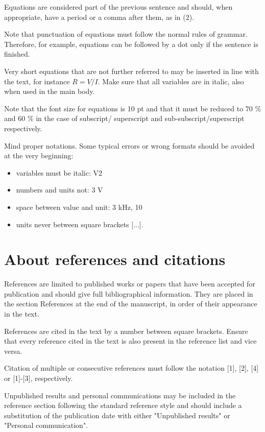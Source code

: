 \documentclass[10pt]{../imeko_acta}
\begin{document}
Equations are considered part of the previous sentence and should, when appropriate, have a period or a comma after them, as in (2).

Note that punctuation of equations must follow the normal rules of grammar. Therefore, for example, equations can be followed by a dot only if the sentence is finished.

Very short equations that are not further referred to may be inserted in line with the text, for instance $R = V/I$. Make sure that all variables are in italic, also when used in the main body. 

Note that the font size for equations is 10 pt and that it must be reduced to 70 \% and 60 \% in the case of subscript/ superscript and sub-subscript/superscript respectively.

Mind proper notations. Some typical errors or wrong formats 
should be avoided at the very beginning: 
\begin{itemize}
	\item variables must be italic: V2
	\item numbers and units not: 3 V
	\item space between value and unit: 3 kHz, 10 %
	\item units never between square brackets [...].
\end{itemize}

\section{About references and citations}

References are limited to published works or papers that have been accepted for publication and should give full bibliographical information. They are placed in the section References at the end of the manuscript, in order of their appearance in the text.

References are cited in the text by a number between square brackets. Ensure that every reference cited in the text is also present in the reference list and vice versa.

Citation of multiple or consecutive references must follow the notation [1], [2], [4] or [1]-[3], respectively.

Unpublished results and personal communications may be included in the reference section following the standard reference style and should include a substitution of the publication date with either "Unpublished results" or "Personal communication". 
\end{document}

